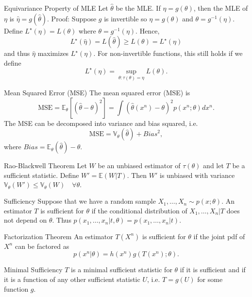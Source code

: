 \documentclass[avery5371,grid]{flashcards}
\begin{document}
\begin{flashcard}[Theorem]{Equivariance Property of MLE}
\scriptsize
Let $\hat \theta$ be the MLE. If $\eta = g(\theta)$, then the MLE of $\eta$ is 
$\hat \eta = g(\hat \theta)$.
Proof: Suppose $g$ is invertible so $\eta = g(\theta)$ and $\theta = g^{-1}(\eta)$. Define
$L^\star(\eta) = L(\theta)$ where $\theta = g^{-1}(\eta)$. Hence,
\[
L^\star(\hat \eta)  = L(\hat \theta) \ge L(\theta) = L^{\star}(\eta)
\]
and thus $\hat \eta$ maximizes $L^\star(\eta)$. For non-invertible functions, this still holds if
we define
\[
L^\star(\eta) = \sup_{\theta: \tau(\theta) = \eta} L(\theta).
\]
\end{flashcard}

\begin{flashcard}[Theorem]{Mean Squared Error (MSE)}
The mean squared error (MSE) is
\[
\text{MSE} = \mathbb{E}_\theta \left[ (\hat \theta - \theta)^2 \right] = \int (\hat \theta(x^n) - \theta)^2 p(x^n;\theta) dx^n.
\]
The MSE can be decomposed into variance and bias squared, i.e.
\[
\text{MSE} = \mathbb{V}_\theta(\hat \theta) + \textit{Bias}^2,
\]
where $\textit{Bias} = \mathbb{E}_\theta(\hat \theta) - \theta$.
\end{flashcard}

\begin{flashcard}[Theorem]{Rao-Blackwell Theorem}
Let $W$ be an unbiased estimator of $\tau(\theta)$ and let $T$ be a sufficient statistic. Define
$W' = \mathbb{E}(W|T)$. Then $W'$ is unbiased with variance $\mathbb{V}_\theta (W') \le 
\mathbb{V}_\theta(W) \quad \forall \theta$.

\end{flashcard}

\begin{flashcard}[Definition]{Sufficiency}
Suppose that we have a random sample $X_1, \ldots, X_n \sim p(x;\theta)$. An estimator $T$
is sufficient for $\theta$ if the conditional distribution of $X_1,\ldots,X_n|T$ does not depend on $\theta$.
Thus $p(x_1,\ldots, x_n|t,\theta) = p(x_1, \ldots, x_n | t)$.
\end{flashcard}

\begin{flashcard}[Theorem]{Factorization Theorem}
An estimator $T(X^n)$ is sufficient for $\theta$ if the joint pdf of $X^n$ can be factored as
\[
p(x^n|\theta) = h(x^n) g \left(T(x^n);\theta \right).
\]
\end{flashcard}

\begin{flashcard}[Definition]{Minimal Sufficiency}
$T$ is a minimal sufficient statistic for $\theta$ if it is sufficient and
if it is a function of any other sufficient statistic $U$, i.e. $T=g(U)$ for some function $g$.
\end{flashcard}
\end{document}
